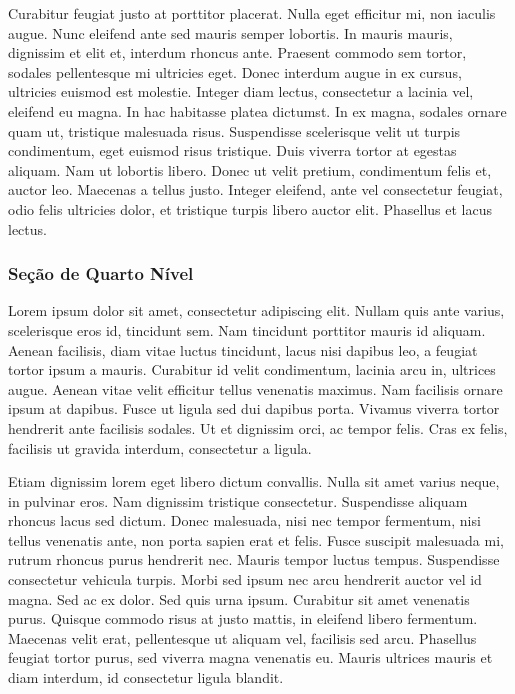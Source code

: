 			Curabitur feugiat justo at porttitor placerat. Nulla eget efficitur mi, non iaculis augue. Nunc eleifend ante sed mauris semper lobortis. In mauris mauris, dignissim et elit et, interdum rhoncus ante. Praesent commodo sem tortor, sodales pellentesque mi ultricies eget. Donec interdum augue in ex cursus, ultricies euismod est molestie. Integer diam lectus, consectetur a lacinia vel, eleifend eu magna. In hac habitasse platea dictumst. In ex magna, sodales ornare quam ut, tristique malesuada risus. Suspendisse scelerisque velit ut turpis condimentum, eget euismod risus tristique. Duis viverra tortor at egestas aliquam. Nam ut lobortis libero. Donec ut velit pretium, condimentum felis et, auctor leo. Maecenas a tellus justo. Integer eleifend, ante vel consectetur feugiat, odio felis ultricies dolor, et tristique turpis libero auctor elit. Phasellus et lacus lectus.
			
			\subsubsection{\esp  Seção de Quarto Nível}\label{section:1.1.1.1}
			
				Lorem ipsum dolor sit amet, consectetur adipiscing elit. Nullam quis ante varius, scelerisque eros id, tincidunt sem. Nam tincidunt porttitor mauris id aliquam. Aenean facilisis, diam vitae luctus tincidunt, lacus nisi dapibus leo, a feugiat tortor ipsum a mauris. Curabitur id velit condimentum, lacinia arcu in, ultrices augue. Aenean vitae velit efficitur tellus venenatis maximus. Nam facilisis ornare ipsum at dapibus. Fusce ut ligula sed dui dapibus porta. Vivamus viverra tortor hendrerit ante facilisis sodales. Ut et dignissim orci, ac tempor felis. Cras ex felis, facilisis ut gravida interdum, consectetur a ligula.

				Etiam dignissim lorem eget libero dictum convallis. Nulla sit amet varius neque, in pulvinar eros. Nam dignissim tristique consectetur. Suspendisse aliquam rhoncus lacus sed dictum. Donec malesuada, nisi nec tempor fermentum, nisi tellus venenatis ante, non porta sapien erat et felis. Fusce suscipit malesuada mi, rutrum rhoncus purus hendrerit nec. Mauris tempor luctus tempus. Suspendisse consectetur vehicula turpis. Morbi sed ipsum nec arcu hendrerit auctor vel id magna. Sed ac ex dolor. Sed quis urna ipsum. Curabitur sit amet venenatis purus. Quisque commodo risus at justo mattis, in eleifend libero fermentum. Maecenas velit erat, pellentesque ut aliquam vel, facilisis sed arcu. Phasellus feugiat tortor purus, sed viverra magna venenatis eu. Mauris ultrices mauris et diam interdum, id consectetur ligula blandit.

